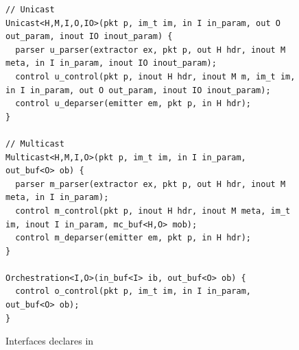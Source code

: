 \documentclass[letterpaper,twocolumn,10pt]{article}
\begin{document}

\begin{figure}[h]
\begin{lstlisting}[frame=none]
// Unicast
Unicast<H,M,I,O,IO>(pkt p, im_t im, in I in_param, out O out_param, inout IO inout_param) {
  parser u_parser(extractor ex, pkt p, out H hdr, inout M meta, in I in_param, inout IO inout_param);
  control u_control(pkt p, inout H hdr, inout M m, im_t im, in I in_param, out O out_param, inout IO inout_param);
  control u_deparser(emitter em, pkt p, in H hdr);                             
}

// Multicast
Multicast<H,M,I,O>(pkt p, im_t im, in I in_param, out_buf<O> ob) {
  parser m_parser(extractor ex, pkt p, out H hdr, inout M meta, in I in_param);
  control m_control(pkt p, inout H hdr, inout M meta, im_t im, inout I in_param, mc_buf<H,O> mob);
  control m_deparser(emitter em, pkt p, in H hdr);
}

Orchestration<I,O>(in_buf<I> ib, out_buf<O> ob) {                         
  control o_control(pkt p, im_t im, in I in_param, out_buf<O> ob);
}    
\end{lstlisting}
\caption{Interfaces declares in \uarch}
\label{fig:programmable-blocks-for-interfaces}
\end{figure}
\end{document}
